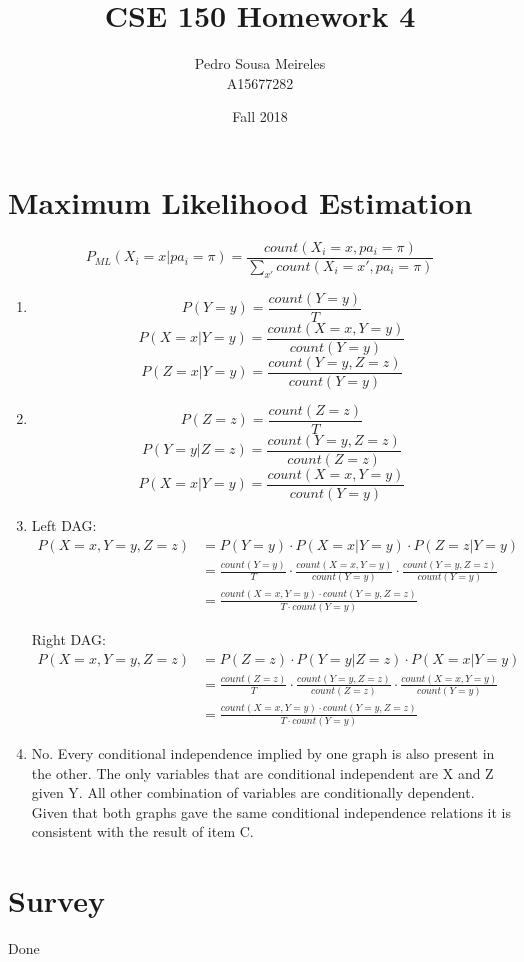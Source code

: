 \documentclass[11]{article}
\title{CSE 150 Homework 4}
\date{Fall 2018}
\author{Pedro Sousa Meireles\\ A15677282}
\begin{document}
\maketitle
\section{Maximum Likelihood Estimation}
$$P_{ML}(X_i=x|pa_i=\pi)=\frac{count(X_i=x,pa_i=\pi)}{\sum_{x'}count(X_i=x',pa_i=\pi)}$$
\begin{enumerate}[label=(\alph*)]
\item
$$P(Y=y)=\frac{count(Y=y)}{T}$$
$$P(X=x|Y=y)=\frac{count(X=x,Y=y)}{count(Y=y)}$$
$$P(Z=x|Y=y)=\frac{count(Y=y,Z=z)}{count(Y=y)}$$
\item
$$P(Z=z)=\frac{count(Z=z)}{T}$$
$$P(Y=y|Z=z)=\frac{count(Y=y,Z=z)}{count(Z=z)}$$
$$P(X=x|Y=y)=\frac{count(X=x,Y=y)}{count(Y=y)}$$
\item
Left DAG:
\begin{align*}
P(X=x, Y=y, Z=z)&=P(Y=y) \cdot P(X=x|Y=y) \cdot P(Z=z|Y=y)\\
&=\frac{count(Y=y)}{T} \cdot \frac{count(X=x,Y=y)}{count(Y=y)} \cdot \frac{count(Y=y,Z=z)}{count(Y=y)}\\
&=\frac{count(X=x,Y=y) \cdot count(Y=y,Z=z)}{T \cdot count(Y=y)}
\end{align*}

Right DAG:
\begin{align*}
P(X=x, Y=y, Z=z)&=P(Z=z) \cdot P(Y=y|Z=z) \cdot P(X=x|Y=y)\\
&=\frac{count(Z=z)}{T} \cdot \frac{count(Y=y,Z=z)}{count(Z=z)} \cdot \frac{count(X=x,Y=y)}{count(Y=y)}\\
&=\frac{count(X=x,Y=y) \cdot count(Y=y,Z=z)}{T \cdot count(Y=y)}
\end{align*}

\item
No. Every conditional independence implied by one graph is also present in the other. The only variables that are conditional independent are X and Z given Y. All other combination of variables are conditionally dependent. Given that both graphs gave the same conditional independence relations it is consistent with the result of item C.
\end{enumerate}
\pagebreak

\section{Survey}
Done
\end{document}
